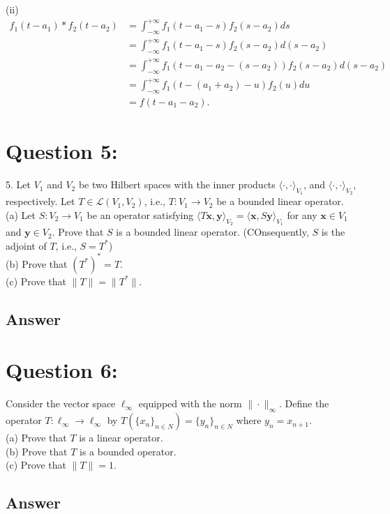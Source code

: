 \documentclass[a4paper,12pt]{article}
\begin{document}
(ii)
\begin{align*}
    f_1(t-a_1) * f_2(t-a_2) &= \int_{-\infty}^{+\infty}f_1(t-a_1 - s)f_2(s-a_2)ds\\
    &= \int_{-\infty}^{+\infty}f_1(t-a_1 - s)f_2(s-a_2)d(s - a_2) \\
    &= \int_{-\infty}^{+\infty}f_1(t-a_1 - a_2 - (s - a_2))f_2(s-a_2)d(s - a_2) \\
    &= \int_{-\infty}^{+\infty}f_1(t-(a_1 + a_2) - u)f_2(u)du \\
    &=f(t-a_1-a_2).
\end{align*}

\section*{Question 5:}
5. Let \(V_1\) and \(V_2\) be two Hilbert spaces with the inner products \(\langle \cdot, \cdot \rangle_{V_1}\), and \(\langle \cdot, \cdot\rangle_{V_2}\), respectively.
Let \(T \in \mathcal{L}(V_1, V_2)\), i.e., \(T: V_1 \to V_2\) be a bounded linear operator. \\
(a) Let \(S:V_2 \to V_1\) be an operator satisfying \(\langle T\bm{x}, \bm{y}\rangle_{V_2} = \langle \bm{x}, S\bm{y}\rangle_{V_1}\) for any \(\bm{x} \in V_1\) and \(\bm{y} \in V_2\).
Prove that \(S\) is a bounded linear operator. (COnsequently, \(S\) is the adjoint of \(T\), i.e., \(S = T^*\)) \\
(b) Prove that \((T^*)^* = T\). \\
(c) Prove that \(\|T\| = \|T^*\|\).


\subsection*{Answer}

\section*{Question 6:}
Consider the vector space \(\ell_{\infty}\) equipped with the norm \(\|\cdot\|_{\infty}\). Define the operator \(T: \ell_{\infty} \to \ell_{\infty}\) by \(T(\{x_n\}_{n \in N}) = \{y_n\}_{n\in N}\) where \(y_n = x_{n+1}\). \\
(a) Prove that \(T\) is a linear operator. \\
(b) Prove that \(T\) is a bounded operator. \\
(c) Prove that \(\|T\|=1\).

\subsection*{Answer}
\end{document}
